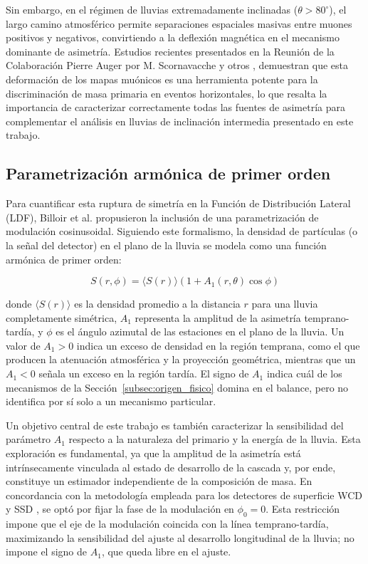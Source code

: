 Sin embargo, en el régimen de lluvias extremadamente inclinadas ($\theta > 80^\circ$), el largo camino atmosférico permite separaciones espaciales masivas entre muones positivos y negativos, convirtiendo a la deflexión magnética en el mecanismo dominante de asimetría. Estudios recientes presentados en la Reunión de la Colaboración Pierre Auger por M. Scornavacche \cite{Scornavacche2026} y otros \cite{collaboration_2014}, demuestran que esta deformación de los mapas muónicos es una herramienta potente para la discriminación de masa primaria en eventos horizontales, lo que resalta la importancia de caracterizar correctamente todas las fuentes de asimetría para complementar el análisis en lluvias de inclinación intermedia presentado en este trabajo.

\subsection{Parametrización armónica de primer orden}
\label{subsec:parametrizacion}

Para cuantificar esta ruptura de simetría en la Función de Distribución Lateral (LDF), Billoir et al. \cite{Billoir2002} propusieron la inclusión de una parametrización de modulación cosinusoidal. Siguiendo este formalismo, la densidad de partículas (o la señal del detector) en el plano de la lluvia se modela como una función armónica de primer orden:

\begin{equation}
	S(r,\phi) = \langle S(r) \rangle \left( 1 + A_1(r, \theta) \cos\phi \right)
	\label{eq:asimetria_a1}
\end{equation}

donde $\langle S(r) \rangle$ es la densidad promedio a la distancia $r$ para una lluvia completamente simétrica, $A_1$ representa la amplitud de la asimetría temprano-tardía, y $\phi$ es el ángulo azimutal de las estaciones en el plano de la lluvia. Un valor de $A_1 > 0$ indica un exceso de densidad en la región temprana, como el que producen la atenuación atmosférica y la proyección geométrica, mientras que un $A_1 < 0$ señala un exceso en la región tardía. El signo de $A_1$ indica cuál de los mecanismos de la Sección~\ref{subsec:origen_fisico} domina en el balance, pero no identifica por sí solo a un mecanismo particular.

Un objetivo central de este trabajo es también caracterizar la sensibilidad del parámetro $A_1$ respecto a la naturaleza del primario y la energía de la lluvia. Esta exploración es fundamental, ya que la amplitud de la asimetría está intrínsecamente vinculada al estado de desarrollo de la cascada y, por ende, constituye un estimador independiente de la composición de masa. En concordancia con la metodología empleada para los detectores de superficie WCD y SSD \cite{BradfieldThesis}, se optó por fijar la fase de la modulación en $\phi_0 = 0$. Esta restricción impone que el eje de la modulación coincida con la línea temprano-tardía, maximizando la sensibilidad del ajuste al desarrollo longitudinal de la lluvia; no impone el signo de $A_1$, que queda libre en el ajuste.


